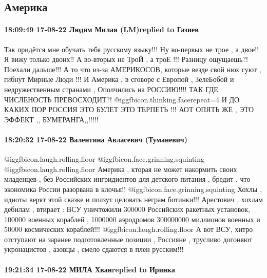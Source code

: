  
 
 
 
 

\subsection{Америка}

\paragraph{18:09:49 17-08-22 Людям Милая (LM)replied to Газиев}

Так придётся мне обучать тебя русскому языку!!!
Ну во-первых не трое , а двое!! Я вижу только двоих!!
А во-вторых не
ТроЙ , а троЕ !!! Разницу ощущаешь?!
Поехали дальше!!!
А то что из-за АМЕРИКОСОВ, которые везде свой нюх суют , гибнут Мирные Люди !!!
И Америка , в сговоре с Европой , ЗелеБобой и недружественным странами , Ополчились на РОССИЮ!!!! ТАК ГДЕ ЧИСЛЕНОСТЬ ПРЕВОСХОДИТ?! @igg{fbicon.thinking.face}{repeat=4}  И ДО КАКИХ ПОР РОССИЯ ЭТО БУЛЕТ ЭТО ТЕРПЕТЬ !!!
АОТ ОПЯТЬ ЖЕ , ЭТО ЭФФЕКТ ,, БУМЕРАНГА,,!!!!!


\paragraph{18:20:32 17-08-22 Валентина Авласевич (Туманевич)}

@igg{fbicon.laugh.rolling.floor}  @igg{fbicon.face.grinning.squinting}
@igg{fbicon.laugh.rolling.floor}  Америка , кторая не может накормить своих
младенцев , без Российских ингридиентов для детского питания , бредит , что
экономика России разорвана в клочья!! @igg{fbicon.face.grinning.squinting}
Хохлы , идиоты верят этой сказке и ползут целовать неграм ботинки!!!
Арестович , хохлам дебилам , втирает : ВСУ уничтожили 300000 Российских
ракетных установок, 100000 военных кораблей , 1000000 аэродромов 300000000
миллионов военных и 50000 космических кораблей!!!
@igg{fbicon.laugh.rolling.floor}  А вот ВСУ, хитро отступают на заранее
подготовленные позиции , Россияне , трусливо догоняют укронацистов , азовцы ,
смело сдаются в плен русским!!!

\paragraph{19:21:34 17-08-22 МИЛА Хванreplied to Иринка}

